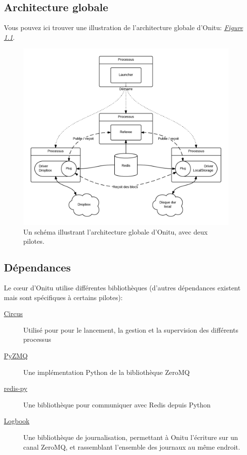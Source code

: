 \documentclass[letterpaper,10pt,english]{sphinxmanual}
\begin{document}
\subsection{Architecture globale}
\label{intro:global-architecture}
Vous pouvez ici trouver une illustration de l'architecture globale d'Onitu: {\hyperref[intro:schematic]{\emph{Figure 1.1}}}.
\begin{figure}[htbp]
\centering
\capstart

\includegraphics{global_archi.png}
\caption{Un schéma illustrant l'architecture globale d'Onitu, avec deux pilotes.}\label{intro:schematic}\end{figure}


\subsection{Dépendances}
\label{intro:dependencies}
Le cœur d'Onitu utilise différentes bibliothèques (d'autres dépendances existent mais sont spécifiques à certains pilotes):
\begin{description}
\item[{\href{http://circus.readthedocs.org}{Circus}}] \leavevmode
Utilisé pour pour le lancement, la gestion et la supervision des différents processus

\item[{\href{http://github.com/zeromq/pyzmq}{PyZMQ}}] \leavevmode
Une implémentation Python de la bibliothèque ZeroMQ

\item[{\href{http://github.com/andymccurdy/redis-py}{redis-py}}] \leavevmode
Une bibliothèque pour communiquer avec Redis depuis Python

\item[{\href{http://pythonhosted.org/Logbook/}{Logbook}}] \leavevmode
Une bibliothèque de journalisation, permettant à Onitu l'écriture sur un canal ZeroMQ, et rassemblant l'ensemble des journaux au même endroit.

\end{description}
\end{document}

